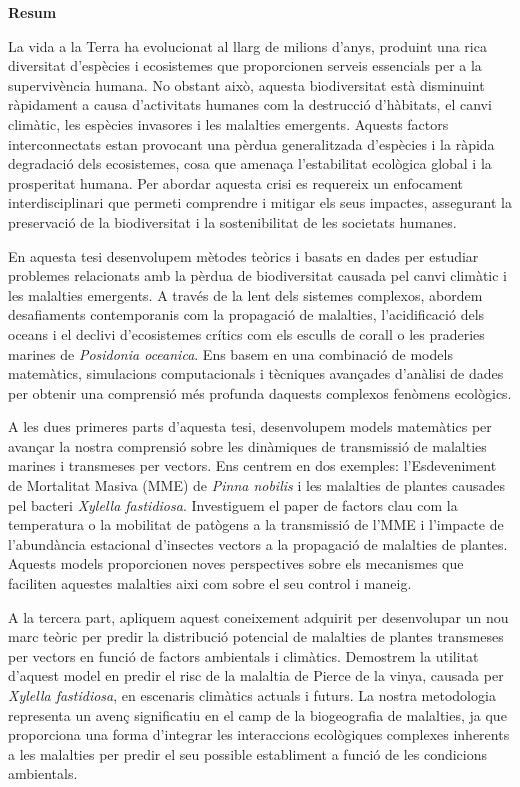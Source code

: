 \begin{center}
    \textbf{\Large Resum}
\end{center}

La vida a la Terra ha evolucionat al llarg de milions d'anys,
produint una rica diversitat d'espècies i ecosistemes que proporcionen serveis
essencials per a la supervivència humana. No obstant això, aquesta
biodiversitat està disminuint ràpidament a causa d'activitats humanes
com la destrucció d'hàbitats, el canvi climàtic, les espècies invasores i les
malalties emergents. Aquests factors interconnectats estan provocant una pèrdua
generalitzada d'espècies i la ràpida degradació dels ecosistemes, cosa que
amenaça l'estabilitat ecològica global i la prosperitat humana. Per abordar
aquesta crisi es requereix un enfocament interdisciplinari que permeti
comprendre i mitigar els seus impactes, assegurant la preservació de la
biodiversitat i la sostenibilitat de les societats humanes.

En aquesta tesi desenvolupem mètodes teòrics i basats en dades per estudiar
problemes relacionats amb la pèrdua de biodiversitat causada pel canvi
climàtic i les malalties emergents. A través de la lent dels sistemes
complexos, abordem desafiaments contemporanis com la propagació de malalties,
l'acidificació dels oceans i el declivi d'ecosistemes crítics com els esculls
de corall o les praderies marines de \textit{Posidonia oceanica}. Ens basem en
una combinació de models matemàtics, simulacions computacionals i tècniques
avançades d'anàlisi de dades per obtenir una comprensió més profunda daquests
complexos fenòmens ecològics.

A les dues primeres parts d'aquesta tesi, desenvolupem models matemàtics
per avançar la nostra comprensió sobre les dinàmiques de transmissió de
malalties marines i transmeses per vectors. Ens centrem en dos exemples:
l'Esdeveniment de Mortalitat Masiva (MME) de \textit{Pinna nobilis} i les
malalties de plantes causades pel bacteri \textit{Xylella fastidiosa}.
Investiguem el paper de factors clau com la temperatura o la mobilitat de
patògens a la transmissió de l'MME i l'impacte de l'abundància estacional
d'insectes vectors a la propagació de malalties de plantes. Aquests models
proporcionen noves perspectives sobre els mecanismes que faciliten aquestes
malalties aixi com sobre el seu control i maneig.

A la tercera part, apliquem aquest coneixement adquirit per desenvolupar un
nou marc teòric per predir la distribució potencial de malalties de
plantes transmeses per vectors en funció de factors ambientals i
climàtics. Demostrem la utilitat d'aquest model en predir el risc de la
malaltia de Pierce de la vinya, causada per \textit{Xylella fastidiosa}, en
escenaris climàtics actuals i futurs. La nostra metodologia representa un
avenç significatiu en el camp de la biogeografia de malalties, ja que
proporciona una forma d'integrar les interaccions ecològiques complexes
inherents a les malalties per predir el seu possible establiment a
funció de les condicions ambientals.

